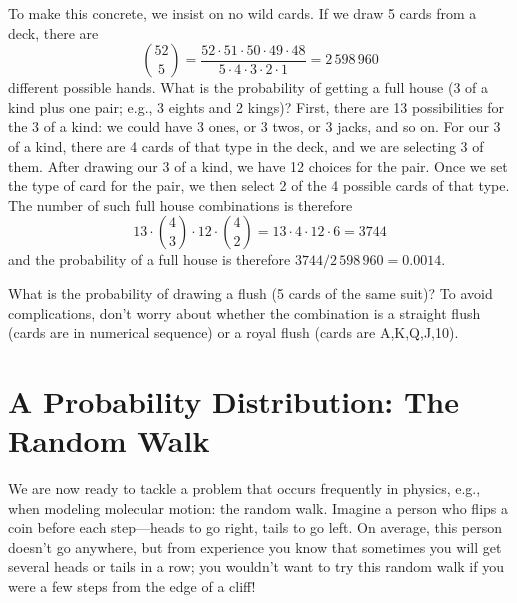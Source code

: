  To make this concrete, we insist on no wild cards.  If we draw 5 cards from a deck, there are
\[
{52\choose5} = \frac{52\cdot51\cdot50\cdot49\cdot48}{5\cdot4\cdot3\cdot2\cdot1} = 2\,598\,960 
\]
different possible hands. What is the probability of getting a full house (3 of a kind plus one pair; e.g., 3 eights and 2 kings)? First, there are 13 possibilities for the 3 of a kind: we could have 3 ones, or 3 twos, or 3 jacks, and so on. For our 3 of a kind, there are 4 cards of that type in the deck, and we are selecting 3 of them. After drawing our 3 of a kind, we have 12 choices for the pair. Once we set the type of card for the pair, we then select 2 of the 4 possible cards of that type. The number of such full house combinations is therefore
\[
	13\cdot{4\choose3}\cdot12\cdot{4\choose2} = 13\cdot 4\cdot12\cdot 6 = 3744
\]
and the probability of a full house is therefore $3744/2\,598\,960 = 0.0014$.

\begin{exercisebox}
What is the probability of drawing a flush (5 cards of the same suit)? To avoid complications, don't worry about whether the combination is a straight flush (cards are in numerical sequence) or a royal flush (cards are A,K,Q,J,10).
\end{exercisebox}

\section{A Probability Distribution: The Random Walk}
We are now ready to tackle a problem that occurs frequently in physics, e.g., when modeling molecular motion: the random walk.  Imagine a person who flips a coin before each step---heads to go right, tails to go left.  On average, this person doesn't go anywhere, but from experience you know that sometimes you will get several heads or tails in a row; you wouldn't want to try this random walk if you were a few steps from the edge of a cliff!

